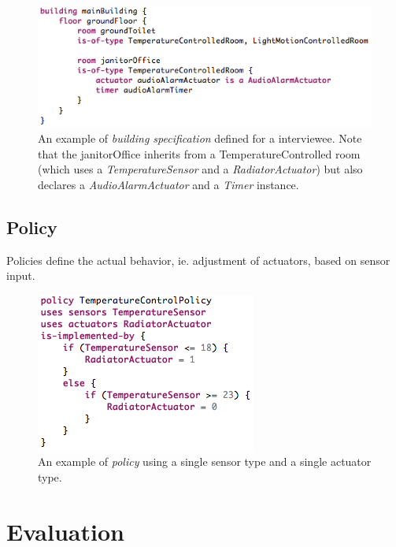 \documentclass{llncs}
\begin{document}
\begin{figure}
  \centering
  \includegraphics[scale=.5]{dsl-building-definition.png}  
  \caption{An example of \textit{building specification} defined for a interviewee. Note that the janitorOffice inherits from a TemperatureControlled room (which uses a \textit{TemperatureSensor} and a \textit{RadiatorActuator}) but also declares a \textit{AudioAlarmActuator} and a \textit{Timer} instance.}
  \label{fig:dsl-building-definition}
\end{figure}

\subsection{Policy}\label{subsec:policies}
Policies define the actual behavior, ie. adjustment of actuators, based on sensor input. 

\begin{figure}
  \centering
    \includegraphics[scale=.5]{dsl-policy-definition.png} 
	\caption{An example of \textit{policy} using a single sensor type and a single actuator type.}
	\label{fig:dsl-policy-definition}
\end{figure}

\section{Evaluation}\label{sec:evaluation}
\end{document}
